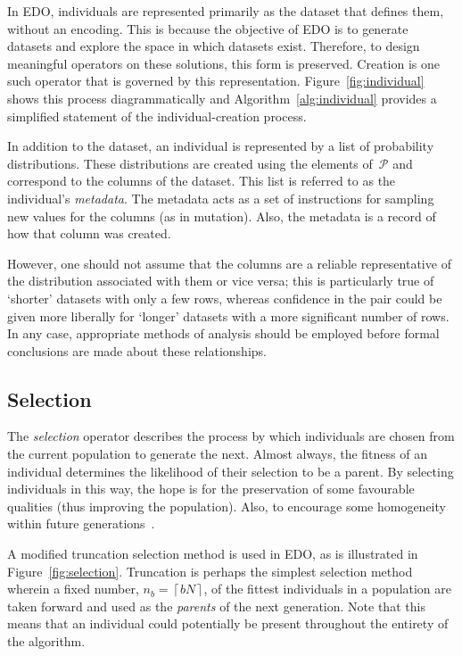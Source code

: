 In EDO, individuals are represented primarily as the dataset that defines them,
without an encoding. This is because the objective of EDO is to generate
datasets and explore the space in which datasets exist. Therefore, to design
meaningful operators on these solutions, this form is preserved. Creation is one
such operator that is governed by this representation.
Figure~\ref{fig:individual} shows this process diagrammatically and
Algorithm~\ref{alg:individual} provides a simplified statement of the
individual-creation process.

In addition to the dataset, an individual is represented by a list of
probability distributions. These distributions are created using the elements
of~\(\mathcal{P}\) and correspond to the columns of the dataset. This list is
referred to as the individual's \emph{metadata}. The metadata acts as a set of
instructions for sampling new values for the columns (as in mutation). Also, the
metadata is a record of how that column was created.

However, one should not assume that the columns are a reliable representative of
the distribution associated with them or vice versa; this is particularly true
of `shorter' datasets with only a few rows, whereas confidence in the pair could
be given more liberally for `longer' datasets with a more significant number of
rows. In any case, appropriate methods of analysis should be employed before
formal conclusions are made about these relationships.



\subsection{Selection}

The \emph{selection} operator describes the process by which individuals are
chosen from the current population to generate the next. Almost always, the
fitness of an individual determines the likelihood of their selection to be a
parent. By selecting individuals in this way, the hope is for the preservation
of some favourable qualities (thus improving the population). Also, to encourage
some homogeneity within future generations~\cite{Back1994}.


A modified truncation selection method is used in EDO, as is illustrated in
Figure~\ref{fig:selection}. Truncation is perhaps the simplest selection method
wherein a fixed number, \(n_b = \left\lceil b N\right\rceil\), of the fittest
individuals in a population are taken forward and used as the \emph{parents} of
the next generation. Note that this means that an individual could potentially
be present throughout the entirety of the algorithm.

